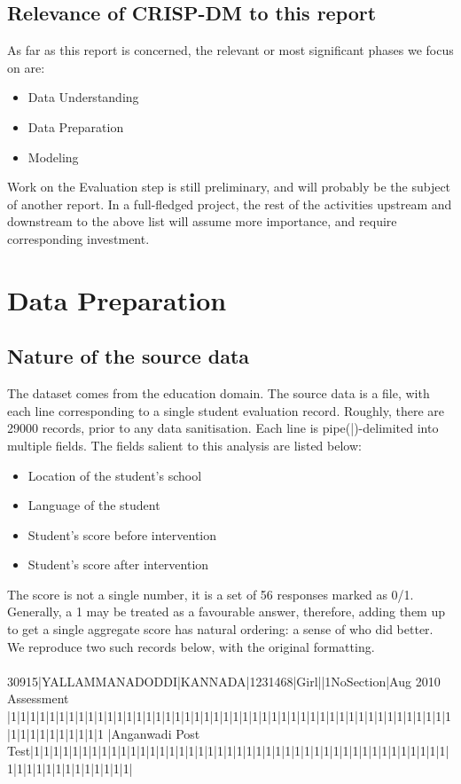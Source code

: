 \documentclass[10pt]{article}
\begin{document}
\subsection{Relevance of CRISP-DM to this report}
As far as this report is concerned, the relevant or most significant phases we focus on are:
\begin{itemize}
\item Data Understanding
\item Data Preparation
\item Modeling
\end{itemize}

Work on the Evaluation step is still preliminary, and will probably be the subject of another report. In a full-fledged project, the rest of the activities upstream and downstream to the above list will assume more importance, and require corresponding investment.

\newpage
\section{Data Preparation}
\newpage
\subsection{Nature of the source data}
The dataset comes from the education domain. The source data is a file, with each line corresponding to a single student evaluation record. Roughly, there are 29000 records, prior to any data sanitisation. Each line is pipe(|)-delimited into multiple fields. The fields salient to this analysis are listed below:

\begin{itemize}
\item Location of the student's school
\item Language of the student
\item Student's score before intervention
\item Student's score after intervention
\end{itemize}

The score is not a single number, it is a set of 56 responses marked as 0/1. Generally, a 1 may be treated as a favourable answer, therefore, adding them up to get a single aggregate score has natural ordering: a sense of who did better. We reproduce two such records below, with the original formatting.\\\\
{\footnotesize
30915|YALLAMMANADODDI|KANNADA|1231468|Girl||1NoSection|Aug 2010 Assessment
|1|1|1|1|1|1|1|1|1|1|1|1|1|1|1|1|1|1|1|1|1|1|1|1|1|1|1|1|1|1|1|1|1|1|1|1|1|1|1|1|1|1|1|1|1|1|1|1|1|1|1|1|1|1|1|1
|Anganwadi Post Test|1|1|1|1|1|1|1|1|1|1|1|1|1|1|1|1|1|1|1|1|1|1|1|1|1|1|1|1|1|1|1|1|1|1|1|1|1|1|1|1|1|1|1|1|1|1|1|1|1|1|1|1|1|1|1|1|}\\
\end{document}
